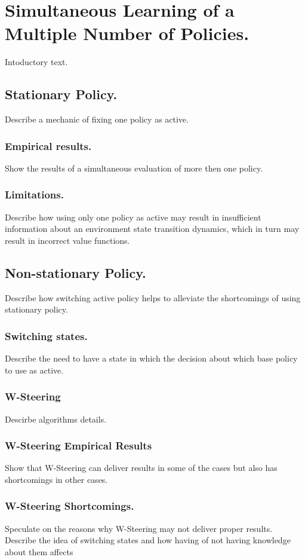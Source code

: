 \chapter{Simultaneous Learning of a Multiple Number of Policies.}

Intoductory text.

\section{Stationary Policy.}

Describe a mechanic of fixing one policy as active.

\subsection{Empirical results.}

Show the results of a simultaneous evaluation of more then one policy.

\subsection{Limitations.}

Describe how using only one policy as active may result in insufficient information about an environment state transition dynamics, which in turn may result in incorrect value functions.

\section{Non-stationary Policy.}

Describe how switching active policy helps to alleviate the shortcomings of using stationary policy.

\subsection{Switching states.}

Describe the need to have a state in which the decision about which base policy to use as active.

\subsection{W-Steering}

Descirbe algorithms details.

\subsection{W-Steering Empirical Results}

Show that W-Steering can deliver results in some of the cases but also has shortcomings in other cases.

\subsection{W-Steering Shortcomings.}

Speculate on the reasons why W-Steering may not deliver proper results. Describe the idea of switching states and how having of not having knowledge about them affects 

